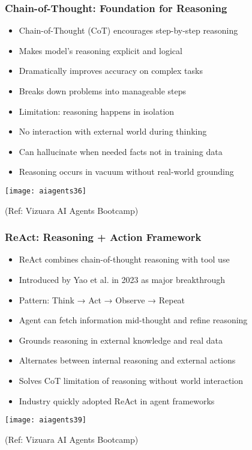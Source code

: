 \begin{frame}[fragile]\frametitle{Chain-of-Thought: Foundation for Reasoning}
      \begin{itemize}
	  \item Chain-of-Thought (CoT) encourages step-by-step reasoning
	  \item Makes model's reasoning explicit and logical
	  \item Dramatically improves accuracy on complex tasks
	  \item Breaks down problems into manageable steps
	  \item Limitation: reasoning happens in isolation
	  \item No interaction with external world during thinking
	  \item Can hallucinate when needed facts not in training data
	  \item Reasoning occurs in vacuum without real-world grounding
	  \end{itemize}
	  
		\begin{center}
		\texttt{[image: aiagents36]}

		{\tiny (Ref: Vizuara AI Agents Bootcamp)}

		\end{center}	  
\end{frame}

\begin{frame}[fragile]\frametitle{ReAct: Reasoning + Action Framework}
      \begin{itemize}
	  \item ReAct combines chain-of-thought reasoning with tool use
	  \item Introduced by Yao et al. in 2023 as major breakthrough
	  \item Pattern: Think → Act → Observe → Repeat
	  \item Agent can fetch information mid-thought and refine reasoning
	  \item Grounds reasoning in external knowledge and real data
	  \item Alternates between internal reasoning and external actions
	  \item Solves CoT limitation of reasoning without world interaction
	  \item Industry quickly adopted ReAct in agent frameworks
	  \end{itemize}
	  
		\begin{center}
		\texttt{[image: aiagents39]}

		{\tiny (Ref: Vizuara AI Agents Bootcamp)}

		\end{center}		  
\end{frame}

